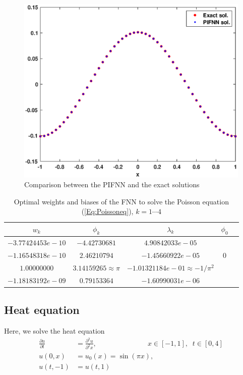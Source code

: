 \documentclass[AMS,STIX1COL]{WileyNJD-v2}
\begin{document}
  \begin{figure}[!htb]
    \centering
    \includegraphics[width=.45\textwidth]{poisson_exvsFNNL2.eps}
    \caption{\;Comparison between the PIFNN and the exact solutions}
    \label{fig:FNNvsexactPoisson}
\end{figure}

 \begin{table}[!h]
  \begin{center}
\begin{tabular}{ |c|c|c|c|c| } 
\hline
$w_k$ & $\phi_k$ & $\lambda_k$& $\phi_0$ \\
\hline
$-3.77424453e-10$ & $-4.42730681$ &$4.90842033e-05$& \\ 
$-1.16548318e-10$&$ 2.46210794$ & $-1.45660922e-05$& $0$ \\ 
$1.00000000$& $ 3.14159265 \approx \pi$ & $-1.01321184e-01 \approx -1/\pi^2$& \\ 
$ -1.18183192e-09$& $ 0.79153364 $ & $-1.60990031e-06$& \\ 
\hline
\end{tabular}
\caption{\;Optimal weights and biases of the FNN to solve the Poisson equation (\ref{Eq:Poissoneq}), $k = 1\cdots4$ }\label{tab:tabPoisson}
\end{center}
\end{table}




\subsection{Heat equation}
Here, we solve the heat equation 
\begin{align}\label{Eq:Heateq}
    \frac{\partial u}{\partial t} &= \frac{\partial^2 u}{\partial^2 x},\;\;\;\;\;\;\;\;\;\;\;\;\;\;\;\;\;\;\;\;\;\;\;\;\; \;x \in [-1,1], \; \;t \in [0,4] \nonumber \\
    u(0,x) &= u_0(x) = \sin(\pi x),\\
    u(t, -1) &= u(t, 1) \nonumber
\end{align}
\end{document}
